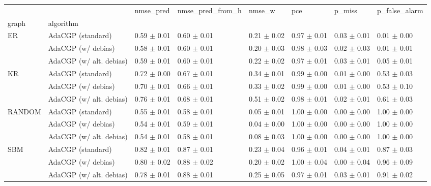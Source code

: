 \begin{tabular}{llllllll}
\toprule
    &                         &        nmse_pred & nmse_pred_from_h &           nmse_w &              pce &           p_miss &    p_false_alarm \\
graph & algorithm &                  &                  &                  &                  &                  &                  \\
\midrule
ER & AdaCGP (standard) &  0.59 $\pm$ 0.01 &  0.60 $\pm$ 0.01 &  0.21 $\pm$ 0.02 &  0.97 $\pm$ 0.01 &  0.03 $\pm$ 0.01 &  0.01 $\pm$ 0.00 \\
    & AdaCGP (w/ debias) &  0.58 $\pm$ 0.01 &  0.60 $\pm$ 0.01 &  0.20 $\pm$ 0.03 &  0.98 $\pm$ 0.03 &  0.02 $\pm$ 0.03 &  0.01 $\pm$ 0.01 \\
    & AdaCGP (w/ alt. debias) &  0.59 $\pm$ 0.01 &  0.60 $\pm$ 0.01 &  0.22 $\pm$ 0.02 &  0.97 $\pm$ 0.01 &  0.03 $\pm$ 0.01 &  0.05 $\pm$ 0.01 \\
KR & AdaCGP (standard) &  0.72 $\pm$ 0.00 &  0.67 $\pm$ 0.01 &  0.34 $\pm$ 0.01 &  0.99 $\pm$ 0.00 &  0.01 $\pm$ 0.00 &  0.53 $\pm$ 0.03 \\
    & AdaCGP (w/ debias) &  0.70 $\pm$ 0.01 &  0.66 $\pm$ 0.01 &  0.33 $\pm$ 0.02 &  0.99 $\pm$ 0.00 &  0.01 $\pm$ 0.00 &  0.53 $\pm$ 0.10 \\
    & AdaCGP (w/ alt. debias) &  0.76 $\pm$ 0.01 &  0.68 $\pm$ 0.01 &  0.51 $\pm$ 0.02 &  0.98 $\pm$ 0.01 &  0.02 $\pm$ 0.01 &  0.61 $\pm$ 0.03 \\
RANDOM & AdaCGP (standard) &  0.55 $\pm$ 0.01 &  0.58 $\pm$ 0.01 &  0.05 $\pm$ 0.01 &  1.00 $\pm$ 0.00 &  0.00 $\pm$ 0.00 &  1.00 $\pm$ 0.00 \\
    & AdaCGP (w/ debias) &  0.54 $\pm$ 0.01 &  0.59 $\pm$ 0.01 &  0.04 $\pm$ 0.00 &  1.00 $\pm$ 0.00 &  0.00 $\pm$ 0.00 &  1.00 $\pm$ 0.00 \\
    & AdaCGP (w/ alt. debias) &  0.54 $\pm$ 0.01 &  0.58 $\pm$ 0.01 &  0.08 $\pm$ 0.03 &  1.00 $\pm$ 0.00 &  0.00 $\pm$ 0.00 &  1.00 $\pm$ 0.00 \\
SBM & AdaCGP (standard) &  0.82 $\pm$ 0.01 &  0.87 $\pm$ 0.01 &  0.23 $\pm$ 0.04 &  0.96 $\pm$ 0.01 &  0.04 $\pm$ 0.01 &  0.87 $\pm$ 0.03 \\
    & AdaCGP (w/ debias) &  0.80 $\pm$ 0.02 &  0.88 $\pm$ 0.02 &  0.20 $\pm$ 0.02 &  1.00 $\pm$ 0.04 &  0.00 $\pm$ 0.04 &  0.96 $\pm$ 0.09 \\
    & AdaCGP (w/ alt. debias) &  0.78 $\pm$ 0.01 &  0.88 $\pm$ 0.01 &  0.25 $\pm$ 0.05 &  0.97 $\pm$ 0.01 &  0.03 $\pm$ 0.01 &  0.91 $\pm$ 0.02 \\
\bottomrule
\end{tabular}

